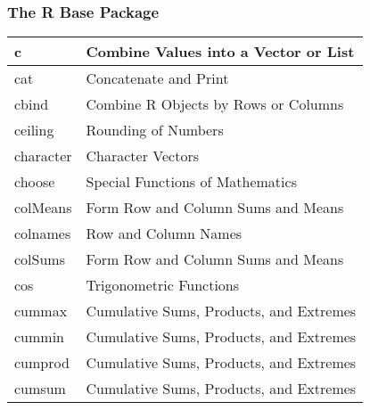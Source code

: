 \documentclass{beamer}
\begin{document}
\begin{frame}
    \frametitle{The R Base Package} 

{\scriptsize
\begin{center}
\begin{tabular}{|l|l|}
 \hline
c	& Combine Values into a Vector or List \\ \hline
cat	& Concatenate and Print \\ \hline
cbind	& Combine R Objects by Rows or Columns \\ \hline
ceiling	& Rounding of Numbers \\ \hline
character	& Character Vectors \\ \hline
choose	& Special Functions of Mathematics \\ \hline
colMeans	& Form Row and Column Sums and Means \\ \hline
colnames	& Row and Column Names \\ \hline
colSums	& Form Row and Column Sums and Means \\ \hline
cos	& Trigonometric Functions \\ \hline
cummax	& Cumulative Sums, Products, and Extremes \\ \hline
cummin	& Cumulative Sums, Products, and Extremes \\ \hline
cumprod	& Cumulative Sums, Products, and Extremes \\ \hline
cumsum	& Cumulative Sums, Products, and Extremes \\ \hline
   \end{tabular}
 \end{center}
}

\end{frame}
\end{document}
